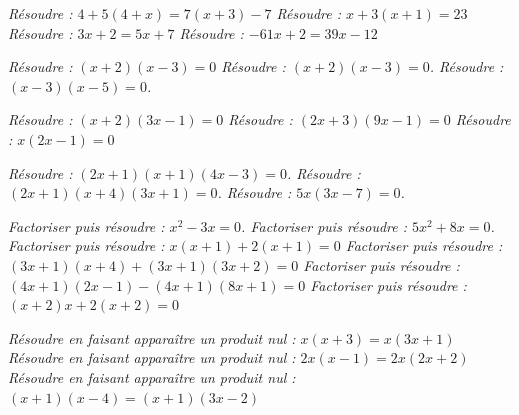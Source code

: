 \if{} \it Résoudre : $ 4 + 5(4+x) = 7(x+3) - 7$\fi
\if{} \it Résoudre : $x + 3(x+1) = 23$\fi
\if{} \it Résoudre : $3x + 2 = 5x + 7$\fi
\if{} \it Résoudre : $-61 x + 2 = 39x - 12$\fi


\if{} \it Résoudre : $(x+2)(x-3) = 0$\fi
\if{} \it Résoudre : $(x+2)(x-3)=0$. \fi
\if{} \it Résoudre : $(x-3)(x-5)=0$. \fi


\if{} \it Résoudre : $(x+2)(3x-1)=0$\fi
\if{}  \it Résoudre : $(2x+3)(9x-1)=0$\fi
\if{}  \it Résoudre : $x(2x-1)=0$\fi


\if{} \it Résoudre : $(2x+1)(x+1)(4x-3) = 0$.\fi
\if{} \it Résoudre : $(2x+1)(x+4)(3x+1)=0$.  \fi
\if{} \it Résoudre : $5x(3x-7)=0$.   \fi


\if{} \it Factoriser puis résoudre : $x^2-3x=0$. \fi
\if{} \it Factoriser puis résoudre : $5x^2+8x=0$. \fi
\if{} \it Factoriser puis résoudre : $x(x+1) + 2(x+1) = 0$\fi
\if{}\it Factoriser puis résoudre : $(3x+1)(x+4) + (3x+1)(3x+2) =0$\fi
\if{} \it Factoriser puis résoudre : $(4x+1)(2x-1)-(4x+1)(8x+1)=0$\fi
\if{} \it Factoriser puis résoudre : $(x+2)x +2(x+2)=0$\fi


\if{} \it Résoudre en faisant apparaître un produit nul : $x(x+3) = x(3x+1)$\fi
\if{} \it Résoudre en faisant apparaître un produit nul : $2x(x-1) = 2x(2x+2)$\fi
\if{} \it Résoudre en faisant apparaître un produit nul : $(x+1)(x-4) = (x+1)(3x-2)$\fi 

